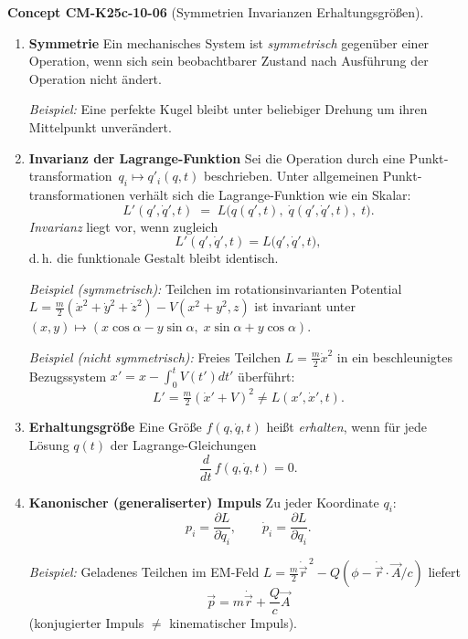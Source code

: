 \documentclass[10pt, letterpaper]{article}
\newcommand{\CustomHeading}[3]{%
  \par\medskip\noindent%
  \textbf{#1 #2} \textnormal{(#3)}.\enskip%
}
\newenvironment{CONC}[2]{\CustomHeading{Concept}{#1}{#2}}{}
\begin{document}
\begin{CONC}{CM-K25c-10-06}{Symmetrien Invarianzen Erhaltungsgrößen}
\begin{enumerate}

\item \textbf{Symmetrie}  
Ein mechanisches System ist \emph{symmetrisch} gegenüber einer
Operation, wenn sich sein beobachtbarer Zustand nach Ausführung der
Operation nicht ändert.

\textit{Beispiel:} Eine perfekte Kugel bleibt unter beliebiger
Drehung um ihren Mittelpunkt unverändert.

\item \textbf{Invarianz der Lagrange-Funktion}  
Sei die Operation durch eine Punkt­transformation
$\,q_i\mapsto q'_i(q,t)$ beschrieben.
Unter allgemeinen Punkt­transformationen verhält sich die
Lagrange-Funktion wie ein Skalar:
\[
  L'(q',\dot q',t)
  \;=\;
  L\!\bigl(q(q',t),\;\dot q(q',\dot q',t),\;t\bigr).
\]
\emph{Invarianz} liegt vor, wenn zugleich
\[
  L'(q',\dot q',t)
  =L\!\bigl(q'\!,\dot q',t\bigr),
\]
d.\,h. die funktionale Gestalt bleibt identisch.

\textit{Beispiel (symmetrisch):} Teilchen im rotations­invarianten
Potential  
$L=\tfrac{m}{2}(\dot x^2+\dot y^2+\dot z^2)-V(x^2+y^2,z)$  
ist invariant unter
$(x,y)\mapsto(x\cos\alpha-y\sin\alpha,\;x\sin\alpha+y\cos\alpha)$.

\textit{Beispiel (nicht symmetrisch):}  
Freies Teilchen  
$L=\tfrac{m}{2}\dot x^{2}$
in ein beschleunigtes Bezugs­system  
$x'=x-\!\int_0^t\!V(t')dt'$ überführt:
\[
  L'=\tfrac{m}{2}(\dot x'+V)^{2}\neq L(x'\!,\dot x',t).
\]

\item \textbf{Erhaltungsgröße}  
Eine Größe
$f(q,\dot q,t)$ heißt \emph{erhalten}, wenn für jede Lösung
$q(t)$ der Lagrange-Gleichungen
\[
  \frac{d}{dt}\,f(q,\dot q,t)=0.
\]

\item \textbf{Kanonischer (generaliserter) Impuls}  
Zu jeder Koordinate $q_i$:
\[
  p_i=\frac{\partial L}{\partial\dot q_i},
  \qquad
  \dot p_i=\frac{\partial L}{\partial q_i}.
\]

\textit{Beispiel:} Geladenes Teilchen im EM-Feld  
$L=\tfrac{m}{2}\dot{\vec r}^{\,2}-Q(\phi-\dot{\vec r}\!\cdot\!\vec A/c)$  
liefert
\[
  \vec p=m\dot{\vec r}+\frac{Q}{c}\vec A
\]
(konjugierter Impuls $\neq$ kinematischer Impuls).


\end{enumerate}
\end{CONC}
\end{document}
